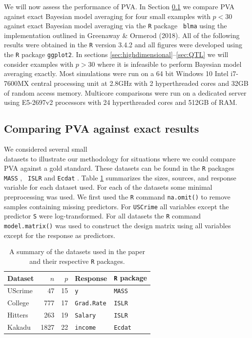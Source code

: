 We will now assess the performance of PVA. In Section \ref{sec:exact} we
compare PVA against exact Bayesian model averaging for four small examples with
$p<30$ against exact Bayesian model averaging via the {\tt R} package {\tt
blma} using the implementation outlined in Greenaway \& Ormerod (2018). All of
the following results were obtained in the {\tt R} version 3.4.2 \citep{CiteR}
and all figures were developed using the {\tt R} package {\tt ggplot2}.  In
sections \ref{sec:highdimensional}--\ref{sec:QTL} we will consider examples
with $p>30$ where it is infeasible to perform Bayesian model averaging exactly.
Most simulations were run on a 64 bit
Windows 10 Intel i7-7600MX central processing unit at 2.8GHz with 2
hyperthreaded cores and 32GB of random access memory.  Multicore comparisons
were run on a dedicated server using E5-2697v2 processors with 24 hyperthreaded
cores and 512GB of RAM.

\subsection{Comparing PVA against exact results} 
\label{sec:exact}

We considered several small \\ datasets to illustrate our methodology for
situations where we could compare PVA against a gold standard. These datasets
can be found in the {\tt R} packages {\tt MASS} \citep{Venables2002},  {\tt
ISLR} \cite{James:2014:ISL:2517747} and {\tt Ecdat} \citep{Croissant2016}.
Table \ref{tab:cva_datasets} summarizes the sizes,  sources, and response
variable for each dataset used.   For each of the datasets some minimal
preprocessing was used.  We first used the {\tt R} command {\tt na.omit()} to
remove samples containing missing predictors.  For {\tt USCrime} all variables
except the predictor {\tt S} were log-transformed. For all datasets the {\tt R}
command {\tt model.matrix()} was used to construct the design matrix using all
variables except for the response as predictors.

\begin{table}[ht!]
	\begin{center}
		\begin{tabular}{l|r|r|l|l}
			Dataset	& $n$ & $p$ & Response & {\tt R} package \\ 
			\hline 
			UScrime 	& 47 & 15 &  {\tt y} & {\tt MASS} \\  
			College &  777   & 17      &  {\tt Grad.Rate}      & {\tt ISLR} \\ 
			Hitters	& 263 & 19 & {\tt Salary} & {\tt ISLR} \\ 
			Kakadu	& 1827 & 22 & {\tt income} & {\tt Ecdat}   \\  
		\end{tabular} 
	\end{center} \bigskip 
	\caption{A summary of the datasets used in the paper and their respective {\tt R} packages.}
	\label{tab:cva_datasets}
\end{table}

